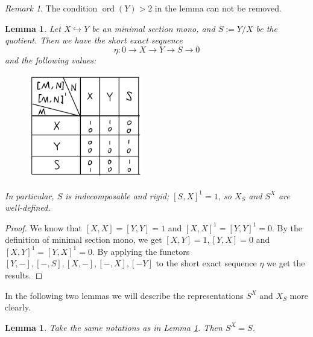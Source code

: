 \documentclass[reqno,11pt]{amsart}
\numberwithin{equation}{section}
\theoremstyle{plain}
\newtheorem{lemma}[theorem]{Lemma}
\theoremstyle{plain}
\numberwithin{equation}{section}
\theoremstyle{remark}
\newtheorem{remark}[theorem]{Remark}
\newcommand{\ord}{\operatorname{ord}}
\begin{document}
\begin{remark}
	The condition $\ord(Y)>2$ in the lemma can not be removed.
\end{remark}
\begin{lemma}\label{lem:value}
Let $X \hookrightarrow Y$ be an minimal section mono, and $S:=Y/X$ be the quotient. Then we have the short exact sequence 
$$\eta: 0 \longrightarrow X \longrightarrow Y \longrightarrow S \longrightarrow 0$$
and the following values:

\begin{center}
	\begin{figure}[ht]\label{fig:table}
		\vspace{0cm}
		\centering
		\includegraphics[width=5cm]{figures/table.png}
	\end{figure}
\end{center}

In particular, $S$ is indecomposable and rigid; $[S,X]^1 =1$, so $X_S$ and $S^X$ are well-defined.
\end{lemma}
\begin{proof}
We know that $[X,X]=[Y,Y]=1$ and $[X,X]^1=[Y,Y]^1=0$. By the definition of minimal section mono, we get
$[X,Y]=1, [Y,X]=0$ and $[X,Y]^1=[Y,X]^1=0$. By applying the functors $[Y,-],[-,S],[X,-],[-,X],[-Y]$ to the short exact sequence $\eta$ we get the results. 
\end{proof}
In the following two lemmas we will describe the representations $S^X$ and $X_S$ more clearly.
\begin{lemma} Take the same notations as in Lemma \ref{lem:value}. Then $S^X=S$.
\end{lemma}
\end{document}
